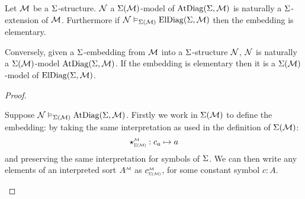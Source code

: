 \begin{prop}
    Let $\mathcal{M}$ be a $\Sigma$-structure.
    $\mathcal{N}$ a $\Sigma(\mathcal{M})$-model of $\mathrm{AtDiag}(\Sigma,\mathcal{M})$ is naturally a 
    $\Sigma$-extension of $\mathcal{M}$.
    Furthermore if
    $\mathcal{N} \vDash_{\Sigma(\mathcal{M})} \mathrm{ElDiag}(\Sigma,\mathcal{M})$ then 
    the embedding is elementary.

    Conversely, given a $\Sigma$-embedding from 
    $\mathcal{M}$ into a $\Sigma$-structure $\mathcal{N}$, 
    $\mathcal{N}$ is naturally a $\Sigma(\mathcal{M})$-model $\mathrm{AtDiag}(\Sigma,\mathcal{M})$.
    If the embedding is elementary then it is a 
    $\Sigma(\mathcal{M})$-model of $\mathrm{ElDiag}(\Sigma,\mathcal{M})$.
\end{prop}
\begin{proof}
    \begin{forward}
        Suppose $\mathcal{N} \vDash_{\Sigma(\mathcal{M})} \mathrm{AtDiag}(\Sigma,\mathcal{M})$.
        Firstly we work in $\Sigma(\mathcal{M})$ to define the embedding:
        by taking the same interpretation as used in the 
        definition of $\Sigma(\mathcal{M})$: 
        \[\intp{\Si(\MM)}{\MM} : c_a \mapsto a\]
        and preserving the same interpretation for symbols of $\Sigma$.
        We can then write any elements of an interpreted sort $\mmintp{A}$ as 
        $\subintp{\Si(\MM)}{\MM}{c}$, 
        for some constant symbol $c : A$.
        

\end{forward}
\end{proof}

